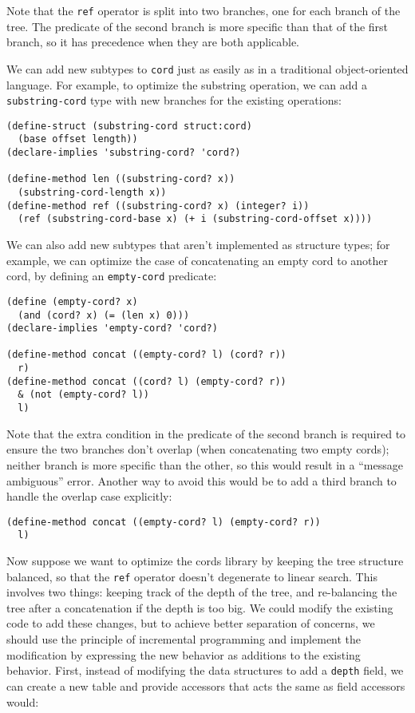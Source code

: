 \documentclass{article}
\newcommand{\code}[1]{\texttt{#1}}
\begin{document}
Note that the \code{ref} operator is split into two branches, one for
each branch of the tree.  The predicate of the second branch is more
specific than that of the first branch, so it has precedence when they 
are both applicable.

We can add new subtypes to \code{cord} just as easily as in a
traditional object-oriented language.  For example, to optimize the
substring operation, we can add a \code{substring-cord} type with
new branches for the existing operations:

\begin{verbatim}
(define-struct (substring-cord struct:cord)
  (base offset length))
(declare-implies 'substring-cord? 'cord?)

(define-method len ((substring-cord? x))
  (substring-cord-length x))
(define-method ref ((substring-cord? x) (integer? i))
  (ref (substring-cord-base x) (+ i (substring-cord-offset x))))
\end{verbatim}

We can also add new subtypes that aren't implemented as structure
types; for example, we can optimize the case of concatenating an empty
cord to another cord, by defining an \code{empty-cord} predicate:

\begin{verbatim}
(define (empty-cord? x)
  (and (cord? x) (= (len x) 0)))
(declare-implies 'empty-cord? 'cord?)

(define-method concat ((empty-cord? l) (cord? r))
  r)
(define-method concat ((cord? l) (empty-cord? r))
  & (not (empty-cord? l))
  l)
\end{verbatim}

Note that the extra condition in the predicate of the second branch is
required to ensure the two branches don't overlap (when concatenating
two empty cords); neither branch is more specific than the other, so
this would result in a ``message ambiguous'' error.  Another way to
avoid this would be to add a third branch to handle the overlap case
explicitly:

\begin{verbatim}
(define-method concat ((empty-cord? l) (empty-cord? r))
  l)
\end{verbatim}

Now suppose we want to optimize the cords library by keeping the tree
structure balanced, so that the \code{ref} operator doesn't degenerate 
to linear search.  This involves two things: keeping track of the
depth of the tree, and re-balancing the tree after a concatenation if
the depth is too big.  We could modify the existing code to add these
changes, but to achieve better separation of concerns, we should use
the principle of incremental programming and implement the
modification by expressing the new behavior as additions to the
existing behavior.  First, instead of modifying the data structures to 
add a \code{depth} field, we can create a new table and provide
accessors that acts the same as field accessors would:
\end{document}
